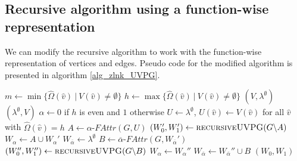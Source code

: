 \subsection{Recursive algorithm using a function-wise representation}
We can modify the recursive algorithm to work with the function-wise representation of vertices and edges. Pseudo code for the modified algorithm is presented in algorithm \ref{alg_zlnk_UVPG}.
\begin{algorithm}
	\caption{$\textsc{recursiveUVPG}(\textit{PG } G = (\\
		V : \hat{V} \rightarrow 2^\mathfrak{C},\\
		\hat{V}_0 \subseteq \hat{V},\\
		\hat{V}_1 \subseteq \hat{V},\\
		E : \hat{E} \rightarrow 2^\mathfrak{C},\\
		\hat{\Omega} : \hat{V}\rightarrow \mathbb{N}$}\label{alg_zlnk_UVPG}
	\begin{algorithmic}[1]
		\State $m \gets \min\{ \hat{\Omega}(\hat{v})\ |\ V(\hat{v}) \neq \emptyset \}$
		\State $h \gets \max\{ \hat{\Omega}(\hat{v})\ |\ V(\hat{v}) \neq \emptyset \}$
		\State \Return $(V,\lambda^\emptyset)$
		\Else
		\State \Return $(\lambda^\emptyset, V)$
		\EndIf
		\EndIf
		\State $\alpha \gets 0$ if $h$ is even and $1$ otherwise
		\State $U \gets \lambda^\emptyset$, $U(\hat{v}) \gets V(\hat{v})$ for all $\hat{v}$ with $\hat{\Omega}(\hat{v}) = h$
		\State $A \gets \alpha\textit{-FAttr}(G, U)$
		\State $(W_0', W_1') \gets \textsc{recursiveUVPG}(G \backslash A)$
		\State $W_\alpha \gets A \cup W_\alpha'$
		\State $W_{\overline{\alpha}} \gets \lambda^\emptyset$
		\Else
		\State $B \gets \overline{\alpha}\textit{-FAttr}(G,W_{\overline{\alpha}}')$
		\State $(W_0'', W_1'') \gets \textsc{recursiveUVPG}(G \backslash B)$
		\State $W_\alpha \gets W_\alpha''$
		\State $W_{\overline{\alpha}} \gets W_{\overline{\alpha}}'' \cup B$
		\EndIf
		\State \Return $(W_0, W_1)$
	\end{algorithmic}
\end{algorithm}

